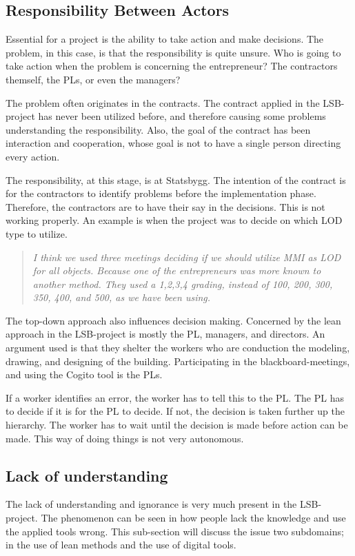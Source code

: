 \subsection{Responsibility Between Actors}
Essential for a project is the ability to take action and make decisions. The problem, in this case, is that the responsibility is quite unsure. Who is going to take action when the problem is concerning the entrepreneur? The contractors themself, the PLs, or even the managers? 

The problem often originates in the contracts. The contract applied in the LSB-project has never been utilized before, and therefore causing some problems understanding the responsibility. Also, the goal of the contract has been interaction and cooperation, whose goal is not to have a single person directing every action. 

The responsibility, at this stage, is at Statsbygg. The intention of the contract is for the contractors to identify problems before the implementation phase. Therefore, the contractors are to have their say in the decisions. This is not working properly. An example is when the project was to decide on which LOD type to utilize.
\begin{quote}
    \textit{I think we used three meetings deciding if we should utilize MMI as LOD for all objects. Because one of the entrepreneurs was more known to another method. They used a 1,2,3,4 grading, instead of 100, 200, 300, 350, 400, and 500, as we have been using.}
\end{quote}

The top-down approach also influences decision making. Concerned by the lean approach in the LSB-project is mostly the PL, managers, and directors. An argument used is that they shelter the workers who are conduction the modeling, drawing, and designing of the building. Participating in the blackboard-meetings, and using the Cogito tool is the PLs. 

If a worker identifies an error, the worker has to tell this to the PL. The PL has to decide if it is for the PL to decide. If not, the decision is taken further up the hierarchy. The worker has to wait until the decision is made before action can be made. This way of doing things is not very autonomous. 

\subsection{Lack of understanding}
The lack of understanding and ignorance is very much present in the LSB-project. The phenomenon can be seen in how people lack the knowledge and use the applied tools wrong. This sub-section will discuss the issue two subdomains; in the use of lean methods and the use of digital tools. 

